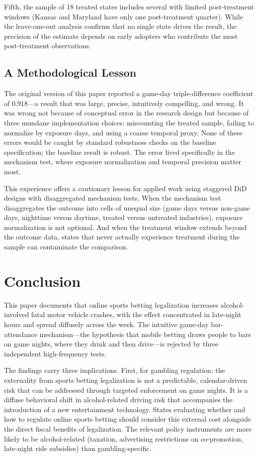 \documentclass[12pt]{article}
\begin{document}
Fifth, the sample of 18 treated states includes several with limited post-treatment windows (Kansas and Maryland have only one post-treatment quarter). While the leave-one-out analysis confirms that no single state drives the result, the precision of the estimate depends on early adopters who contribute the most post-treatment observations.

\subsection{A Methodological Lesson}

The original version of this paper reported a game-day triple-difference coefficient of 0.918---a result that was large, precise, intuitively compelling, and wrong. It was wrong not because of conceptual error in the research design but because of three mundane implementation choices: miscounting the treated sample, failing to normalize by exposure days, and using a coarse temporal proxy. None of these errors would be caught by standard robustness checks on the baseline specification; the baseline result is robust. The error lived specifically in the mechanism test, where exposure normalization and temporal precision matter most.

This experience offers a cautionary lesson for applied work using staggered DiD designs with disaggregated mechanism tests. When the mechanism test disaggregates the outcome into cells of unequal size (game days versus non-game days, nighttime versus daytime, treated versus untreated industries), exposure normalization is not optional. And when the treatment window extends beyond the outcome data, states that never actually experience treatment during the sample can contaminate the comparison.


\section{Conclusion}

This paper documents that online sports betting legalization increases alcohol-involved fatal motor vehicle crashes, with the effect concentrated in late-night hours and spread diffusely across the week. The intuitive game-day bar-attendance mechanism---the hypothesis that mobile betting draws people to bars on game nights, where they drink and then drive---is rejected by three independent high-frequency tests.

The findings carry three implications. First, for gambling regulation: the externality from sports betting legalization is not a predictable, calendar-driven risk that can be addressed through targeted enforcement on game nights. It is a diffuse behavioral shift in alcohol-related driving risk that accompanies the introduction of a new entertainment technology. States evaluating whether and how to regulate online sports betting should consider this external cost alongside the direct fiscal benefits of legalization. The relevant policy instruments are more likely to be alcohol-related (taxation, advertising restrictions on co-promotion, late-night ride subsidies) than gambling-specific.
\end{document}
